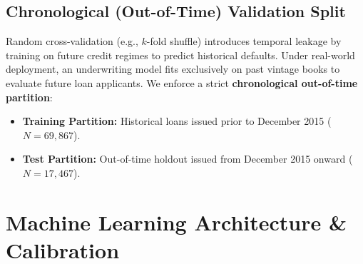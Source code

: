 \documentclass[conference]{IEEEtran}
\begin{document}
\subsection{Chronological (Out-of-Time) Validation Split}
Random cross-validation (e.g., $k$-fold shuffle) introduces temporal leakage by training on future credit regimes to predict historical defaults. Under real-world deployment, an underwriting model fits exclusively on past vintage books to evaluate future loan applicants. We enforce a strict \textbf{chronological out-of-time partition}:
\begin{itemize}
    \item \textbf{Training Partition:} Historical loans issued prior to December 2015 ($N = 69,867$).
    \item \textbf{Test Partition:} Out-of-time holdout issued from December 2015 onward ($N = 17,467$).
\end{itemize}

\section{Machine Learning Architecture \& Calibration}
\end{document}
